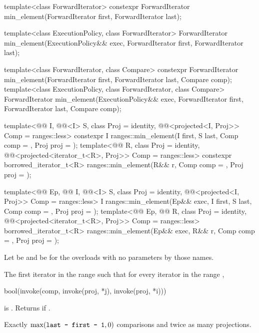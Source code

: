%
\begin{itemdecl}
template<class ForwardIterator>
  constexpr ForwardIterator min_element(ForwardIterator first, ForwardIterator last);

template<class ExecutionPolicy, class ForwardIterator>
  ForwardIterator min_element(ExecutionPolicy&& exec,
                              ForwardIterator first, ForwardIterator last);

template<class ForwardIterator, class Compare>
  constexpr ForwardIterator min_element(ForwardIterator first, ForwardIterator last,
                                        Compare comp);
template<class ExecutionPolicy, class ForwardIterator, class Compare>
  ForwardIterator min_element(ExecutionPolicy&& exec,
                              ForwardIterator first, ForwardIterator last, Compare comp);

template<@@ I, @@<I> S, class Proj = identity,
         @@<projected<I, Proj>> Comp = ranges::less>
  constexpr I ranges::min_element(I first, S last, Comp comp = {}, Proj proj = {});
template<@@ R, class Proj = identity,
         @@<projected<iterator_t<R>, Proj>> Comp = ranges::less>
  constexpr borrowed_iterator_t<R>
    ranges::min_element(R&& r, Comp comp = {}, Proj proj = {});

template<@@ Ep, @@ I, @@<I> S,
         class Proj = identity,
         @@<projected<I, Proj>> Comp = ranges::less>
  I ranges::min_element(Ep&& exec, I first, S last, Comp comp = {}, Proj proj = {});
template<@@ Ep, @@ R,
         class Proj = identity,
         @@<projected<iterator_t<R>, Proj>> Comp = ranges::less>
  borrowed_iterator_t<R>
    ranges::min_element(Ep&& exec, R&& r, Comp comp = {}, Proj proj = {});
\end{itemdecl}

\begin{itemdescr}
\pnum
Let  be 
and  be 
for the overloads with no parameters by those names.

\pnum
\returns
The first iterator  in the range 
such that for every iterator  in the range ,
\begin{codeblock}
bool(invoke(comp, invoke(proj, *j), invoke(proj, *i)))
\end{codeblock}
is .
Returns  if .

\pnum
\complexity
Exactly $\max(\tcode{last - first - 1}, 0)$ comparisons and
twice as many projections.
\end{itemdescr}


